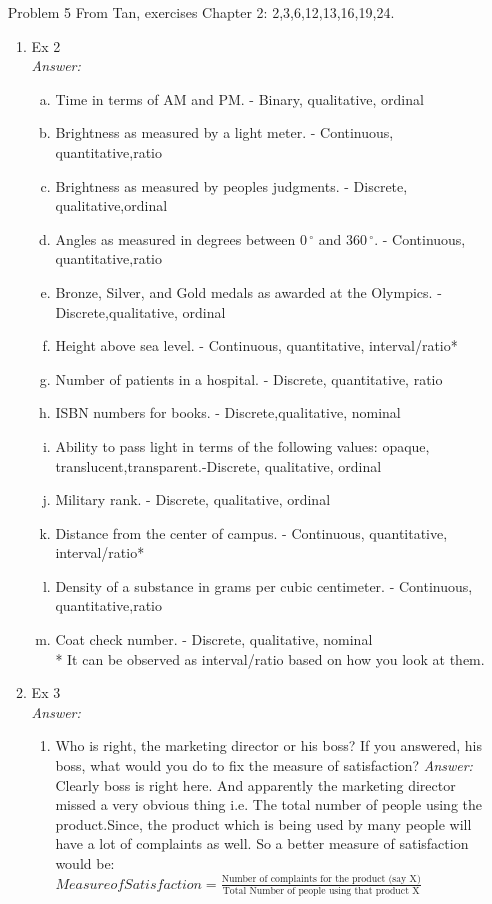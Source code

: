 \documentclass{article}
\begin{document}
\begin{enumerate}
	\item[Problem] 5  From Tan, exercises Chapter 2: 2,3,6,12,13,16,19,24.
		\begin{enumerate}
			\item Ex 2 \\
			\emph{Answer:}
			\begin{enumerate}[(a)]
				\item Time in terms of AM and PM. - Binary, qualitative, ordinal
				\item Brightness as measured by a light meter. - Continuous, quantitative,ratio
				\item Brightness as measured by peoples judgments. - Discrete, qualitative,ordinal
				\item Angles as measured in degrees between $0\,^{\circ}$ and $360\,^{\circ}$. - Continuous, quantitative,ratio
				\item Bronze, Silver, and Gold medals as awarded at the Olympics. - Discrete,qualitative, ordinal
				\item Height above sea level. - Continuous, quantitative, interval/ratio*
				\item Number of patients in a hospital. - Discrete, quantitative, ratio
				\item ISBN numbers for books. - Discrete,qualitative, nominal
				\item Ability to pass light in terms of the following values: opaque, translucent,transparent.-Discrete, qualitative, ordinal
				\item Military rank. - Discrete, qualitative, ordinal
				\item Distance from the center of campus. - Continuous, quantitative, interval/ratio*
				\item Density of a substance in grams per cubic centimeter. - Continuous, quantitative,ratio
				\item Coat check number. - Discrete, qualitative, nominal \\
				* It can be observed as interval/ratio based on how you look at them.
			\end{enumerate}

			\item Ex 3 \\
			\emph{Answer:} 
			\begin{enumerate}
				\item Who is right, the marketing director or his boss? If you answered, his boss, what would you do to fix the measure of satisfaction?
				\emph{Answer:} Clearly boss is right here. And apparently the marketing director missed a very obvious thing i.e. The total number of
				people using the product.Since, the product which is being used by many people will have a lot of complaints as well. So a better measure of
				satisfaction would be: \\
				$Measure of Satisfaction = \frac{\text{Number of complaints for the product (say X)}}{\text{Total Number of people using that product X}}$
				

\end{enumerate}
\end{enumerate}
\end{enumerate}
\end{document}
